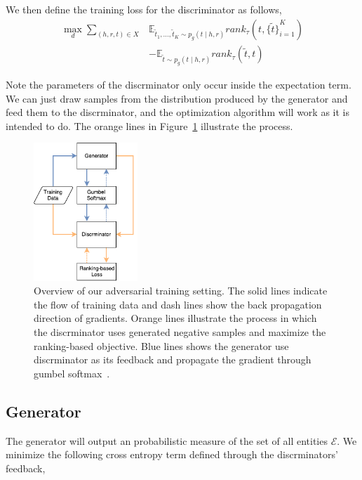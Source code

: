 \documentclass[twocolumn,a4paper,10pt,review,3p]{elsarticle}
\begin{document}
We then define the training loss for the discriminator as follows,
\begin{align*}
    \max_d \sum_{(h, r, t)\in X}
        &\mathbb{E}_{\tilde t_1, \dots, \tilde t_K \sim p_g(t \mid h, r)}
            rank_\tau(t, {\{\tilde t \}}_{i=1}^K) \\
        &- \mathbb{E}_{\tilde t \sim p_g(t \mid h, r)}
            rank_\tau(\tilde t, t)
\end{align*}

Note the parameters of the discrminator only occur inside the expectation term. We can just draw samples from the distribution produced by the generator and feed them to the discrminator, and the optimization algorithm will work as it is intended to do. The orange lines in Figure~\ref{system-overview} illustrate the process.

\begin{figure}[ht]
    \centering
    \includegraphics[width=0.35\textwidth]{images/overview.pdf}
    \caption{Overview of our adversarial training setting. The solid lines indicate the flow of training data and dash lines show the back propagation direction of gradients. Orange lines illustrate the process in which the discrminator uses generated negative samples and maximize the ranking-based objective. Blue lines shows the generator use discrminator as its feedback and propagate the gradient through gumbel softmax~\cite{GumbelSoftmax_Jiang_2016}.}
\label{system-overview}
\end{figure}


\subsection{Generator}

The generator will output an probabilistic measure of the set of all entities $\mathcal{E}$. We minimize the following cross entropy term defined through the discrminators' feedback,
\end{document}
